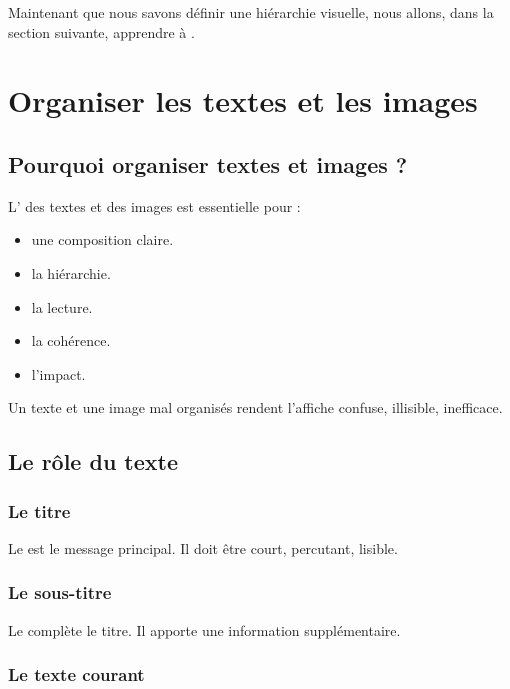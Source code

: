 Maintenant que nous savons définir une hiérarchie visuelle, nous allons, dans la section suivante, apprendre à .

\section{Organiser les textes et les images}

\subsection{Pourquoi organiser textes et images ?}

L' des textes et des images est essentielle pour :

\begin{itemize}
    \item {} une composition claire.
    \item {} la hiérarchie.
    \item {} la lecture.
    \item {} la cohérence.
    \item {} l'impact.
\end{itemize}

Un texte et une image mal organisés rendent l'affiche confuse, illisible, inefficace.

\subsection{Le rôle du texte}

\subsubsection{Le titre}

Le  est le message principal. Il doit être court, percutant, lisible.

\subsubsection{Le sous-titre}

Le  complète le titre. Il apporte une information supplémentaire.

\subsubsection{Le texte courant}

